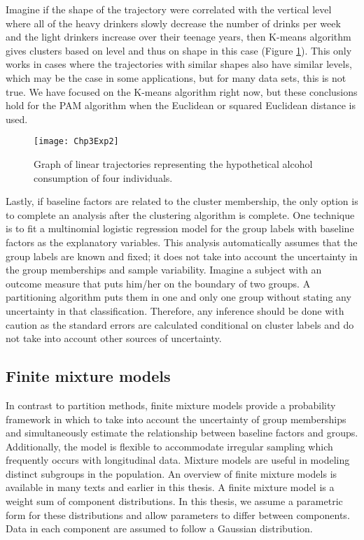 Imagine if the shape of the trajectory were correlated with the vertical level where all of the heavy drinkers slowly decrease the number of drinks per week and the light drinkers increase over their teenage years, then K-means algorithm gives clusters based on level and thus on shape in this case (Figure \ref{fig:3-2}). This only works in cases where the trajectories with similar shapes also have similar levels, which may be the case in some applications, but for many data sets, this is not true. We have focused on the K-means algorithm right now, but these conclusions hold for the PAM algorithm when the Euclidean or squared Euclidean distance is used.
\begin{figure}
\begin{center}
\texttt{[image: Chp3Exp2]}
\end{center}
\caption{Graph of linear trajectories representing the hypothetical alcohol consumption of four individuals.}
\label{fig:3-2} 
\end{figure}

Lastly, if baseline factors are related to the cluster membership, the only option is to complete an analysis after the clustering algorithm is complete. One technique is to fit a multinomial logistic regression model for the group labels with baseline factors as the explanatory variables. This analysis automatically assumes that the group labels are known and fixed; it does not take into account the uncertainty in the group memberships and sample variability. Imagine a subject with an outcome measure that puts him/her on the boundary of two groups. A partitioning algorithm puts them in one and only one group without stating any uncertainty in that classification. Therefore, any inference should be done with caution as the standard errors are calculated conditional on cluster labels and do not take into account other sources of uncertainty.
\subsection{Finite mixture models}
In contrast to partition methods, finite mixture models provide a probability framework in which to take into account the uncertainty of group memberships and simultaneously estimate the relationship between baseline factors and groups. Additionally, the model is flexible to accommodate irregular sampling which frequently occurs with longitudinal data. Mixture models are useful in modeling distinct subgroups in the population. An overview of finite mixture models is available in many texts \cite{everitt1981,mclachlan1988,mclachlan2000} and earlier in this thesis. A finite mixture model is a weight sum of component distributions. In this thesis, we assume a parametric form for these distributions and allow parameters to differ between components. Data in each component are assumed to follow a Gaussian distribution.

